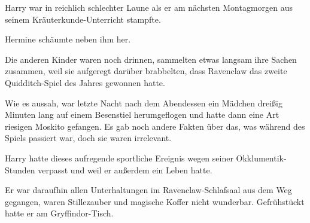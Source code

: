 \later

Harry war in reichlich schlechter Laune als er am nächsten Montagmorgen aus seinem Kräuterkunde-Unterricht stampfte.

Hermine schäumte neben ihm her.

Die anderen Kinder waren noch drinnen, sammelten etwas langsam ihre Sachen zusammen, weil sie aufgeregt darüber brabbelten, dass Ravenclaw das zweite Quidditch-Spiel des Jahres gewonnen hatte.

Wie es aussah, war letzte Nacht nach dem Abendessen ein Mädchen dreißig Minuten lang auf einem Besenstiel herumgeflogen und hatte dann eine Art riesigen Moskito gefangen. Es gab noch andere Fakten über das, was während des Spiels passiert war, doch sie waren irrelevant.

Harry hatte dieses aufregende sportliche Ereignis wegen seiner Okklumentik-Stunden verpasst und weil er außerdem ein Leben hatte.

Er war daraufhin allen Unterhaltungen im Ravenclaw-Schlafsaal aus dem Weg gegangen, waren Stillezauber und magische Koffer nicht wunderbar. Gefrühstückt hatte er am Gryffindor-Tisch.

